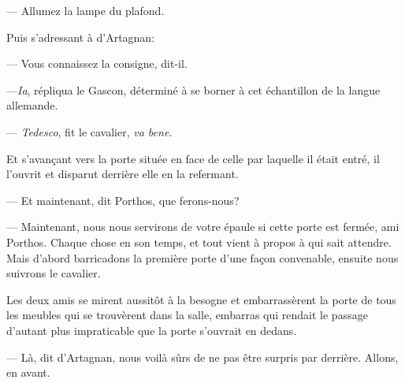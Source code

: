 — Allumez la lampe du plafond.

Puis s'adressant à d'Artagnan:

— Vous connaissez la consigne, dit-il.

—\textit{Ia}, répliqua le Gascon, déterminé à se borner à cet échantillon de la langue allemande.

— \textit{Tedesco}, fit le cavalier, \textit{va bene.}

Et s'avançant vers la porte située en face de celle par laquelle il était entré, il l'ouvrit et disparut derrière elle en la refermant.

— Et maintenant, dit Porthos, que ferons-nous?

— Maintenant, nous nous servirons de votre épaule si cette porte est fermée, ami Porthos. Chaque chose en son temps, et tout vient à propos à qui sait attendre. Mais d'abord barricadons la première porte d'une façon convenable, ensuite nous suivrons le cavalier.

Les deux amis se mirent aussitôt à la besogne et embarrassèrent la porte de tous les meubles qui se trouvèrent dans la salle, embarras qui rendait le passage d'autant plus impraticable que la porte s'ouvrait en dedans.

— Là, dit d'Artagnan, nous voilà sûrs de ne pas être surpris par derrière. Allons, en avant.